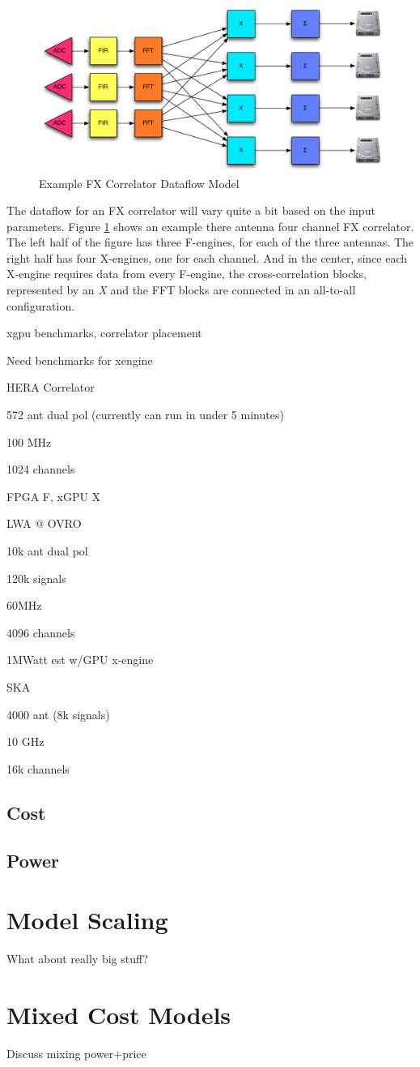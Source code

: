 \begin{figure}[h!]
  \centering
    \includegraphics[width=1\textwidth]{Images/C4/fx_dataflow.pdf}
  \caption{Example FX Correlator Dataflow Model}
  \label{fig: C4/fx_dataflow.pdf}
\end{figure}

The dataflow for an FX correlator will vary quite a bit based on the input parameters. 
Figure \ref{fig: C4/fx_dataflow.pdf} shows an example there antenna four channel FX correlator. 
The left half of the figure has three F-engines, for each of the three antennas.
The right half has four X-engines, one for each channel.
And in the center, since each X-engine requires data from every F-engine, the cross-correlation blocks, represented by an \emph{X} and the FFT blocks are connected in an all-to-all configuration.



xgpu benchmarks, correlator placement

Need benchmarks for xengine

HERA Correlator

572 ant dual pol (currently can run in under 5 minutes)

100 MHz

1024 channels

FPGA F, xGPU X

LWA @ OVRO

10k ant dual pol

120k signals

60MHz

4096 channels

1MWatt est w/GPU x-engine

SKA

4000 ant (8k signals)

10 GHz

16k channels




\subsection{Cost}
\subsection{Power}

\section{Model Scaling}
What about really big stuff?

\section{Mixed Cost Models}
Discuss mixing power+price

